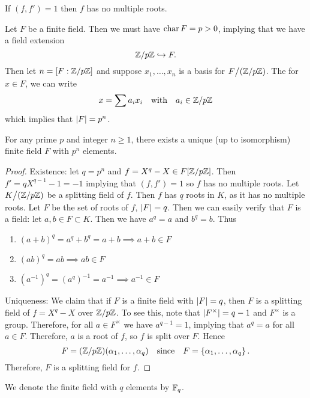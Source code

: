 \begin{cor}
	If $(f,f') = 1$ then $f$ has no multiple roots.
\end{cor}

Let $F$ be a finite field. Then we must have $\operatorname{char} F = p > 0$, implying that we have a field extension
\[
	\mathbb{Z} / p \mathbb{Z} \hookrightarrow F.
\]
Then let $n = [F : \mathbb{Z} / p\mathbb{Z}]$ and suppose $x_1, \ldots, x_n$ is a basis for $F \big / (\mathbb{Z} / p\mathbb{Z})$. The for $x \in F$, we can write
\[
	x = \sum a_i x_i \quad \text{with} \quad a_i \in \mathbb{Z} / p\mathbb{Z}
\]
which implies that $\left|F\right| = p^n$.

\begin{thm}
	For any prime $p$ and integer $n \geq 1$, there exists a unique (up to isomorphism) finite field $F$ with $p^n$ elements.
\end{thm}
\begin{proof}
	Existence: let $q = p^n$ and $f = X^q - X \in F[\mathbb{Z} / p\mathbb{Z}]$. Then $f' = q X^{q-1} - 1 = -1$ implying that $(f,f') = 1$ so $f$ has no multiple roots. Let $K \big/ (\mathbb{Z} / p\mathbb{Z})$ be a splitting field of $f$. Then $f$ has $q$ roots in $K$, as it has no multiple roots. Let $F$ be the set of roots of $f$, $\left|F\right| = q$. Then we can easily verify that $F$ is a field: let $a, b \in F \subset K$. Then we have $a^q = a$ and $b^q = b$. Thus
	\begin{enumerate}
		\item $(a + b)^q = a^q + b^q = a + b \implies a+b \in F$
		\item $(ab)^q = ab \implies ab\in F$
		\item $(a^{-1})^q = (a^q)^{-1}=a^{-1} \implies a^{-1} \in F$
	\end{enumerate}
	Uniqueness: We claim that if $F$ is a finite field with $\left|F\right| = q$, then $F$ is a splitting field of $f = X^q - X$ over $\mathbb{Z} / p\mathbb{Z}$. To see this, note that $\left|F^\times\right| = q-1$ and $F^\times$ is a group. Therefore, for all $a \in F^\times$ we have $a^{q-1} = 1$, implying that $a^q = a$ for all $a \in F$. Therefore, $a$ is a root of $f$, so $f$ is split over $F$. Hence
	\[
		F = (\mathbb{Z} / p \mathbb{Z})(\alpha_1, \ldots, \alpha_q) \quad \text{since} \quad F = \left\{\alpha_1, \ldots, \alpha_q\right\}.
	\]
	Therefore, $F$ is a splitting field for $f$.
\end{proof}

\begin{ntns}
	We denote the finite field with $q$ elements by $\mathbb{F}_q$.
\end{ntns}